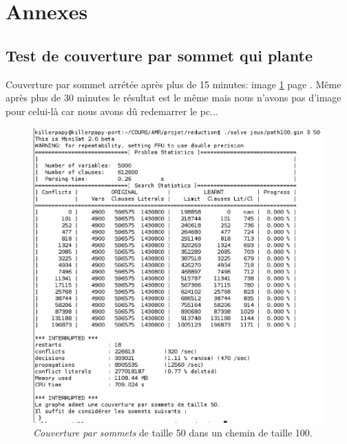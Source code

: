  \section{Annexes}
  \subsection{Test de couverture par sommet qui plante\label{an1}}
  Couverture par sommet arrétée après plus de 15 minutes: image
  \ref{lourd} page \pageref{lourd}. Même après plus de 30 minutes le
  résultat est le même mais nous n'avons pas d'image pour celui-là car
  nous avons dû redemarrer le pc...

  \begin{figure}[!ht]
   \begin{center}
    \includegraphics[width=12cm]{images/couv100.eps}
    \caption{\emph{Couverture par sommets} de taille 50 dans un chemin
    de taille 100.\label{lourd}}
   \end{center}
  \end{figure}

  \newpage

